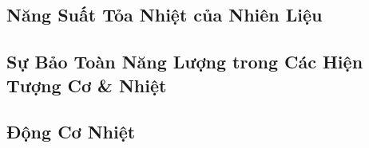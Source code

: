 \documentclass{article}
\numberwithin{equation}{section}
\begin{document}

\subsection{Năng Suất Tỏa Nhiệt của Nhiên Liệu}


\subsection{Sự Bảo Toàn Năng Lượng trong Các Hiện Tượng Cơ \& Nhiệt}


\subsection{Động Cơ Nhiệt}


\printbibliography[heading=bibintoc]
	
\end{document}
